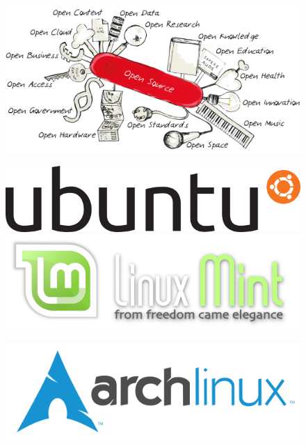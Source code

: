 \begin{frame}
	\begin{figure}
		\includegraphics[scale=1]{resources/open_swiss_knife.png}
	\end{figure}
\end{frame}

\begin{frame}
	\begin{figure}
		\includegraphics[scale=0.3]{resources/640px-Ubuntu_logo.png}
		\includegraphics[scale=0.3]{resources/640px-Linux_Mint_logo_and_wordmark.png}
	\end{figure}
	\begin{figure}
		\includegraphics[scale=0.3]{resources/archlinux-logo.png}
	\end{figure}
\end{frame}

